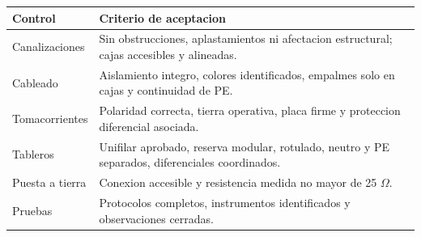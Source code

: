 \begin{center}
\small
\begin{tabularx}{\textwidth}{p{} L}
\toprule
\textbf{Control} & \textbf{Criterio de aceptacion} \\
\midrule
Canalizaciones & Sin obstrucciones, aplastamientos ni afectacion estructural; cajas accesibles y alineadas. \\
Cableado & Aislamiento integro, colores identificados, empalmes solo en cajas y continuidad de PE. \\
Tomacorrientes & Polaridad correcta, tierra operativa, placa firme y proteccion diferencial asociada. \\
Tableros & Unifilar aprobado, reserva modular, rotulado, neutro y PE separados, diferenciales coordinados. \\
Puesta a tierra & Conexion accesible y resistencia medida no mayor de 25 \(\Omega\). \\
Pruebas & Protocolos completos, instrumentos identificados y observaciones cerradas. \\
\bottomrule
\end{tabularx}
\end{center}
